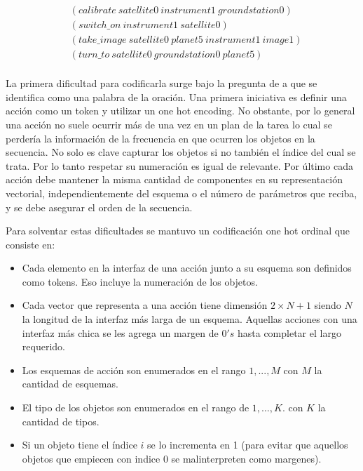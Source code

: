 \begin{align*}
    & (calibrate\ satellite0\ instrument1\ groundstation0) \\
    & (switch\_on\ instrument1\ satellite0) \\
    & (take\_image\ satellite0\ planet5\ instrument1\ image1) \\
    & (turn\_to\ satellite0\ groundstation0\ planet5) \\
\end{align*}

La primera dificultad para codificarla surge bajo la pregunta de a que se
identifica como una palabra de la oración. Una primera iniciativa es definir una
acción como un token y utilizar un one hot encoding. No obstante, por lo general
una acción no suele ocurrir más de una vez en un plan de la tarea lo cual se
perdería la información de la frecuencia en que ocurren los objetos en la
secuencia. No solo es clave capturar los objetos si no también el índice del
cual se trata. Por lo tanto respetar su numeración es igual de relevante. Por
último cada acción debe mantener la misma cantidad de componentes en su
representación vectorial, independientemente del esquema o el número de
parámetros que reciba, y se debe asegurar el orden de la secuencia.

Para solventar estas dificultades se mantuvo un codificación one hot ordinal que
consiste en:

\begin{itemize}
    \item Cada elemento en la interfaz de una acción junto a su esquema son
    definidos como tokens. Eso incluye la numeración de los objetos.
    \item Cada vector que representa a una acción tiene dimensión $2 \times N +
    1$ siendo $N$ la longitud de la interfaz más larga de un esquema. Aquellas
    acciones con una interfaz más chica se les agrega un margen de $0's$ hasta
    completar el largo requerido.
    \item Los esquemas de acción son enumerados en el rango $1, ..., M$ con $M$
    la cantidad de esquemas.
    \item El tipo de los objetos son enumerados en el rango de $1, ..., K$. con
    $K$ la cantidad de tipos.
    \item Si un objeto tiene el índice $i$ se lo incrementa en 1 (para evitar que
    aquellos objetos que empiecen con indice 0 se malinterpreten como margenes).
\end{itemize}

